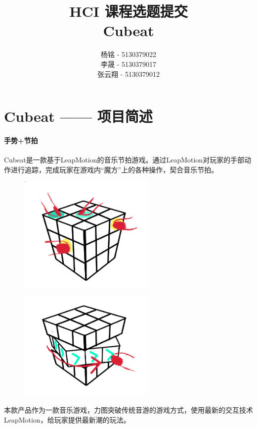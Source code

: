 \documentclass{article} \usepackage{CJK}
\author{杨铭 - 5130379022\\
        李晟 - 5130379017\\
        张云翔 - 5130379012}
\title{HCI 课程选题提交\\\textbf{Cubeat}}
\begin{document}
\maketitle
\tableofcontents
\newpage
\section{Cubeat —— 项目简述}
\paragraph{手势+节拍}
\paragraph{}Cubeat是一款基于LeapMotion的音乐节拍游戏。通过LeapMotion对玩家的手部动作进行追踪，完成玩家在游戏内“魔方”上的各种操作，契合音乐节拍。
\begin{figure}[!h]
\begin{minipage}{0.5\linewidth}
  \includegraphics[width=18em]{pic1.png}\\
  \caption{}\label{1-1}
\end{minipage}
\begin{minipage}{0.5\linewidth}
  \includegraphics[width=18em]{pic2.png}\\
  \caption{}\label{1-2}
\end{minipage}
\end{figure}
\paragraph{}
本款产品作为一款音乐游戏，力图突破传统音游的游戏方式，使用最新的交互技术LeapMotion，给玩家提供最新潮的玩法。
\end{document}
